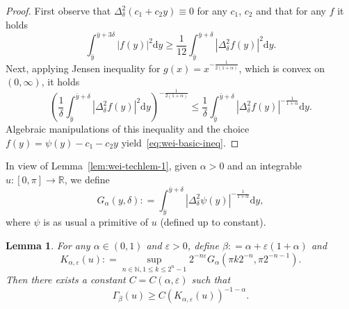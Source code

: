 \documentclass[11pt,oneside,reqno]{amsart}
\newcommand{\mathd}{\mathrm{d}}
\newtheorem{lemma}[theorem]{Lemma}
\numberwithin{equation}{section}
\begin{document}
\begin{proof}
  First observe that $\Delta^2_{\delta} (c_1 + c_2 y) \equiv 0$ for any $c_1$,
  $c_2$ and that for any $f$ it holds
  \[ \int_{\bar{y}}^{\bar{y} + 3 \delta} | f (y) |^2 \mathd y \geqslant
     \frac{1}{12} \int_{\bar{y}}^{\bar{y} + \delta} | \Delta^2_{\delta} f (y)
     |^2 \mathd y. \]
  Next, applying Jensen inequality for $g (x) = x^{- \frac{1}{2 (1 +
  \alpha)}}$, which is convex on $(0, \infty)$, it holds
  \[ \left( \frac{1}{\delta} \int_{\bar{y}}^{\bar{y} + \delta} |
     \Delta^2_{\delta} f (y) |^2 \mathd y \right)^{- \frac{1}{2 (1 + \alpha)}}
     \leqslant \frac{1}{\delta} \int_{\bar{y}}^{\bar{y} + \delta} |
     \Delta^2_{\delta} f (y) |^{- \frac{1}{1 + \alpha}} \mathd y. \]
  Algebraic manipulations of this inequality and the choice $f (y) =
  \psi (y) - c_1 - c_2 y$ yield~\eqref{eq:wei-basic-ineq}.
\end{proof}

In view of Lemma~\ref{lem:wei-techlem-1}, given $\alpha > 0$ and an integrable
$u : [0, \pi] \rightarrow \mathbb{R}$, we define
\begin{equation}
  G_{\alpha} (y, \delta) : = \int_{\bar{y}}^{\bar{y} + \delta} |
  \Delta^2_{\delta} \psi (y) |^{- \frac{1}{1 + \alpha}} \mathd y,
  \label{eq:def-G}
\end{equation}
where $\psi$ is as usual a primitive of $u$ (defined up to constant).

\begin{lemma}
  \label{lem:wei-techlem-2}For any $\alpha \in (0, 1)$ and $\varepsilon > 0$,
  define $\beta : = \alpha + \varepsilon (1 + \alpha)$ and
  \[ K_{\alpha, \varepsilon} (u) : = \sup_{n \in \mathbb{N}, 1 \leqslant k
     \leqslant 2^n - 1} 2^{- n \varepsilon} G_{\alpha} (\pi k 2^{- n}, \pi
     2^{- n - 1}) . \]
  Then there exists a constant $C = C (\alpha, \varepsilon)$ such that
  \[ \Gamma_{\beta} (u) \geqslant C (K_{\alpha, \varepsilon} (u))^{- 1 -
     \alpha} . \]
\end{lemma}
\end{document}
